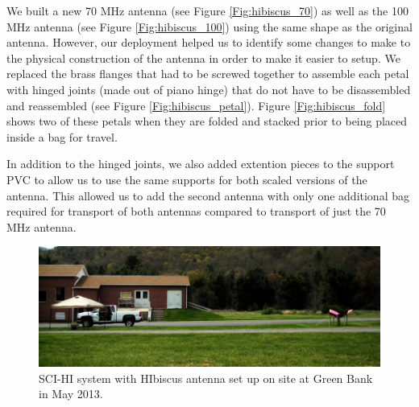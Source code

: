 We built a new 70 MHz antenna (see Figure \ref{Fig:hibiscus_70}) as well as the 100 MHz antenna (see Figure \ref{Fig:hibiscus_100}) using the same shape as the original antenna. However, our deployment helped us to identify some changes to make to the physical construction of the antenna in order to make it easier to setup. We replaced the brass flanges that had to be screwed together to assemble each petal with hinged joints (made out of piano hinge) that do not have to be disassembled and reassembled (see Figure \ref{Fig:hibiscus_petal}). Figure \ref{Fig:hibiscus_fold} shows two of these petals when they are folded and stacked prior to being placed inside a bag for travel. 

In addition to the hinged joints, we also added extention pieces to the support PVC to allow us to use the same supports for both scaled versions of the antenna. This allowed us to add the second antenna with only one additional bag required for transport of both antennas compared to transport of just the 70 MHz antenna.  

\begin{figure}[htb]
\begin{center}

\includegraphics[width=0.95\linewidth]{SCIHI_system/figures/SCIHI_gbt_sys.jpg}
\caption{SCI-HI system with HIbiscus antenna set up on site at Green Bank in May 2013.}
\label{Fig:sys_gbt}

\end{center}
\end{figure}


